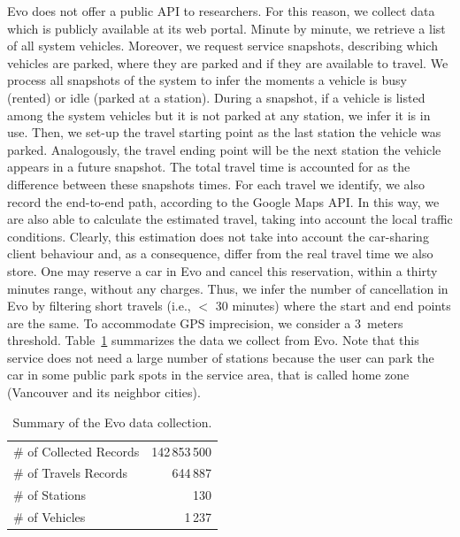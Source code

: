 Evo does not offer a public API to researchers. For this reason, we collect data which is publicly available at its web portal. Minute by minute, we retrieve a list of all system vehicles. Moreover, we request service snapshots, describing which vehicles are parked, where they are parked and if they are available to travel. 
We process all snapshots of the system to infer the moments a vehicle is busy (rented) or idle (parked at a station). During a snapshot, if a vehicle is listed among the system vehicles but it is not parked at any station, we infer it is in use. Then, we set-up the travel starting point as the last station the vehicle was parked. Analogously, the travel ending point will be the next station the vehicle appears in a future snapshot. The total travel time is accounted for as the difference between these snapshots times. 
For each travel we identify, we also record the end-to-end path, according to the Google Maps API. In this way, we are also able to calculate the estimated travel, taking into account the local traffic conditions. Clearly, this estimation does not take into account the car-sharing client behaviour and, as a consequence, differ from the real travel time we also store. 
One may reserve a car in Evo and cancel this reservation, within a thirty minutes range, without any charges. Thus, we infer the number of cancellation in Evo by filtering short travels (i.e., $<$ 30 minutes) where the start and end points are the same. To accommodate GPS imprecision, we consider a 3~meters threshold. 
Table~\ref{table:dataEvo} summarizes the data we collect from Evo.
Note that this service does not need a large number of stations because the user can park the car in some public park spots in the service area, that is called home zone (Vancouver and its neighbor cities).

\begin{table}[htb]
\centering
\setlength{\tabcolsep}{2.3pt}

\begin{tabular}{llr}
\hline
\multicolumn{2}{l}{\# of Collected Records} & 142\,853\,500
\\
\multicolumn{2}{l}{\# of Travels Records} &  644\,887\\
\multicolumn{2}{l}{\# of Stations}  & 130  \\\hline
\multicolumn{2}{l}{\# of Vehicles} & 1\,237
\\\hline
\end{tabular}
\caption{Summary of the Evo data collection.}
\label{table:dataEvo}
\end{table}

